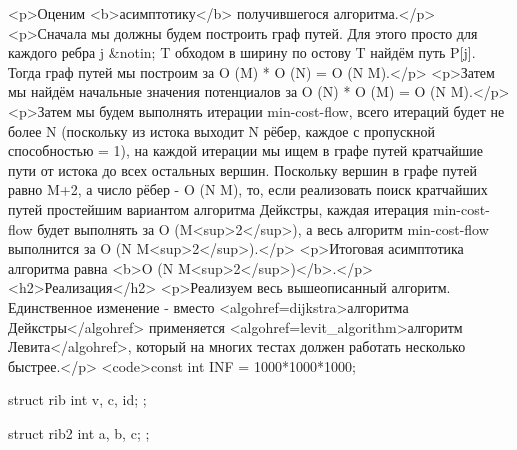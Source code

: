 <p>Оценим <b>асимптотику</b> получившегося алгоритма.</p>
<p>Сначала мы должны будем построить граф путей. Для этого просто для каждого ребра j &notin; T обходом в ширину по остову T найдём путь P[j]. Тогда граф путей мы построим за O (M) * O (N) = O (N M).</p>
<p>Затем мы найдём начальные значения потенциалов за O (N) * O (M) = O (N M).</p>
<p>Затем мы будем выполнять итерации min-cost-flow, всего итераций будет не более N (поскольку из истока выходит N рёбер, каждое с пропускной способностью = 1), на каждой итерации мы ищем в графе путей кратчайшие пути от истока до всех остальных вершин. Поскольку вершин в графе путей равно M+2, а число рёбер - O (N M), то, если реализовать поиск кратчайших путей простейшим вариантом алгоритма Дейкстры, каждая итерация min-cost-flow будет выполнять за O (M<sup>2</sup>), а весь алгоритм min-cost-flow выполнится за O (N M<sup>2</sup>).</p>
<p>Итоговая асимптотика алгоритма равна <b>O (N M<sup>2</sup>)</b>.</p>
<h2>Реализация</h2>
<p>Реализуем весь вышеописанный алгоритм. Единственное изменение - вместо <algohref=dijkstra>алгоритма Дейкстры</algohref> применяется <algohref=levit_algorithm>алгоритм Левита</algohref>, который на многих тестах должен работать несколько быстрее.</p>
<code>const int INF = 1000*1000*1000;

struct rib {
	int v, c, id;
};

struct rib2 {
	int a, b, c;
};

